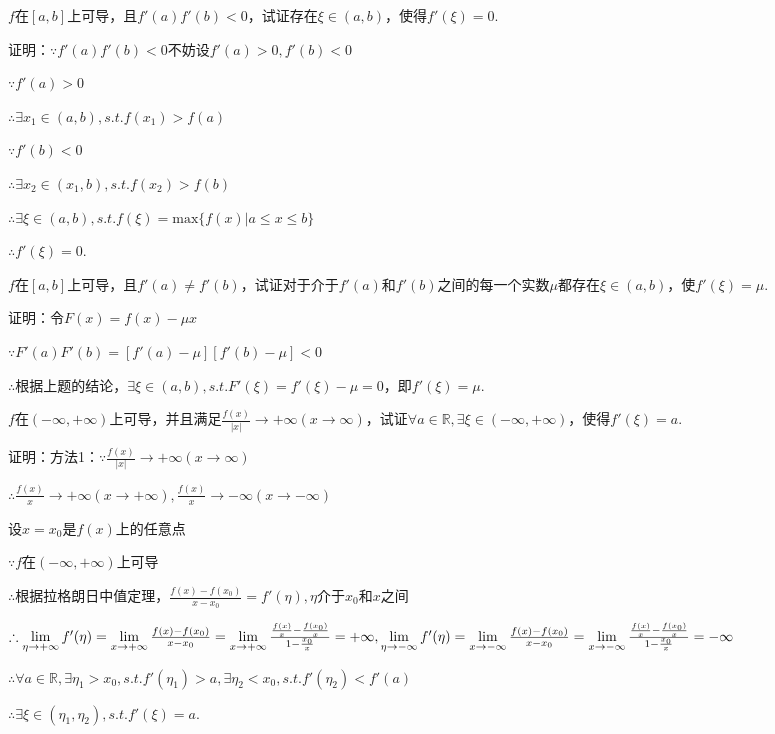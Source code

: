 \documentclass[12pt,UTF8]{ctexart}
\begin{document}
\begin{enumerate}
$f$在$[a,b]$上可导，且$f'(a)f'(b)<0$，试证存在$\xi\in(a,b)$，使得$f'(\xi)=0$.

证明：$\because f'(a)f'(b)<0$不妨设$f'(a)>0,f'(b)<0$

$\because f'(a)>0$

$\therefore\exists x_1\in(a,b),s.t.f(x_1)>f(a)$

$\because f'(b)<0$

$\therefore\exists x_2\in(x_1,b),s.t.f(x_2)>f(b)$

$\therefore\exists\xi\in(a,b),s.t.f(\xi)=\mathrm{max}\{f(x)|a\leq x\leq b\}$

$\therefore f'(\xi)=0$.

$f$在$[a,b]$上可导，且$f'(a)\neq f'(b)$，试证对于介于$f'(a)$和$f'(b)$之间的每一个实数$\mu$都存在$\xi\in(a,b)$，使$f'(\xi)=\mu$.

证明：令$F(x)=f(x)-\mu x$

$\because F'(a)F'(b)=[f'(a)-\mu][f'(b)-\mu]<0$

$\therefore$根据上题的结论，$\exists\xi\in(a,b),s.t.F'(\xi)=f'(\xi)-\mu=0$，即$f'(\xi)=\mu$.

$f$在$(-\infty,+\infty)$上可导，并且满足$\frac{f(x)}{|x|}\rightarrow+\infty(x\rightarrow\infty)$，试证$\forall a\in\mathbb R,\exists\xi\in(-\infty,+\infty)$，使得$f'(\xi)=a$.

证明：方法1：$\because\frac{f(x)}{|x|}\rightarrow+\infty(x\rightarrow\infty)$

$\therefore\frac{f(x)}{x}\rightarrow+\infty(x\rightarrow+\infty),\frac{f(x)}{x}\rightarrow-\infty(x\rightarrow-\infty)$

设$x=x_0$是$f(x)$上的任意点

$\because f$在$(-\infty,+\infty)$上可导

$\therefore$根据拉格朗日中值定理，$\frac{f(x)-f(x_0)}{x-x_0}=f'(\eta),\eta$介于$x_0$和$x$之间

$\therefore\lim\limits_{\eta\rightarrow+\infty}f'(\eta)=\lim\limits_{x\rightarrow+\infty}\frac{f(x)-f(x_0)}{x-x_0}=\lim\limits_{x\rightarrow+\infty}\frac{\frac{f(x)}x-\frac{f(x_0)}x}{1-\frac{x_0}x}=+\infty,\lim\limits_{\eta\rightarrow-\infty}f'(\eta)=\lim\limits_{x\rightarrow-\infty}\frac{f(x)-f(x_0)}{x-x_0}\\
=\lim\limits_{x\rightarrow-\infty}\frac{\frac{f(x)}x-\frac{f(x_0)}x}{1-\frac{x_0}x}=-\infty$

$\therefore\forall a\in\mathbb R,\exists\eta_1>x_0,s.t.f'(\eta_1)>a,\exists\eta_2<x_0,s.t.f'(\eta_2)<f'(a)$

$\therefore\exists\xi\in(\eta_1,\eta_2),s.t.f'(\xi)=a$.


\end{enumerate}
\end{document}
